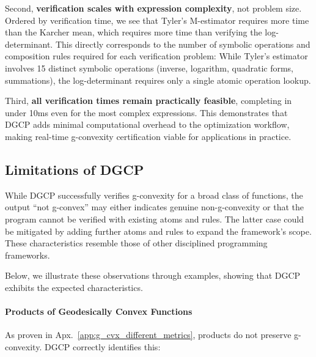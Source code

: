 \documentclass[twoside,11pt]{article}
\begin{document}
Second, \textbf{verification scales with expression complexity}, not problem size. 
Ordered by verification time, we see that 
Tyler's M-estimator requires more time than the Karcher mean, which requires more time than verifying the log-determinant. This directly corresponds to the number of symbolic operations and composition rules required for each verification problem: While Tyler's estimator involves 15 distinct symbolic operations (inverse, logarithm, quadratic forms, summations), the log-determinant requires only a single atomic operation lookup.

Third, \textbf{all verification times remain practically feasible}, completing in under 10ms even for the most complex expressions. This demonstrates that DGCP adds minimal computational overhead to the optimization workflow, making real-time g-convexity certification viable for applications in practice.



\subsection{Limitations of DGCP}
While DGCP successfully verifies g-convexity for a broad class of functions, %
the output 	``not g-convex'' may either indicates genuine non-g-convexity or that the program cannot be verified with existing atoms and rules. The latter case could be mitigated by adding further atoms and rules to expand the framework's scope. These characteristics resemble those of other disciplined programming frameworks.

Below, we illustrate these observations through examples, showing that DGCP exhibits the expected characteristics.

\paragraph{Products of Geodesically Convex Functions}
As proven in Apx.~\ref{app:g_cvx_different_metrics}, products do not preserve g-convexity. DGCP correctly identifies this:
\end{document}
